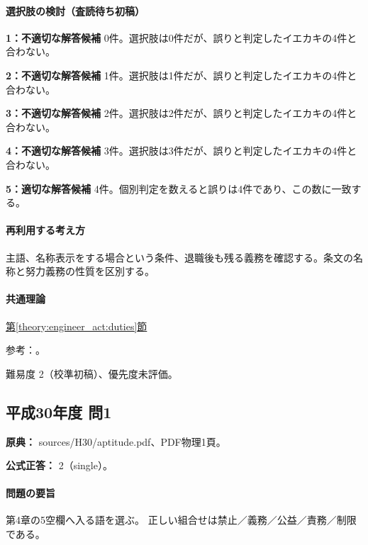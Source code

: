 \paragraph{選択肢の検討（査読待ち初稿）}\mbox{}\par

\noindent\textbf{1：不適切な解答候補} 0件。選択肢は0件だが、誤りと判定したイエカキの4件と合わない。\par

\noindent\textbf{2：不適切な解答候補} 1件。選択肢は1件だが、誤りと判定したイエカキの4件と合わない。\par

\noindent\textbf{3：不適切な解答候補} 2件。選択肢は2件だが、誤りと判定したイエカキの4件と合わない。\par

\noindent\textbf{4：不適切な解答候補} 3件。選択肢は3件だが、誤りと判定したイエカキの4件と合わない。\par

\noindent\textbf{5：適切な解答候補} 4件。個別判定を数えると誤りは4件であり、この数に一致する。\par

\paragraph{再利用する考え方} 主語、名称表示をする場合という条件、退職後も残る義務を確認する。条文の名称と努力義務の性質を区別する。

\paragraph{共通理論} \hyperref[theory:engineer_act:duties]{第\ref*{theory:engineer_act:duties}節}

\par 参考：\cite{engineer_act_current}。

\par 難易度 2（校準初稿）、優先度未評価。

\subsection{平成30年度 問1}
\label{q:h30-reg-apt-01}

\noindent\textbf{原典：} sources/H30/aptitude.pdf、PDF物理1頁。

\textbf{公式正答：} 2（single）。

\paragraph{問題の要旨} 第4章の5空欄へ入る語を選ぶ。 正しい組合せは禁止／義務／公益／責務／制限である。

